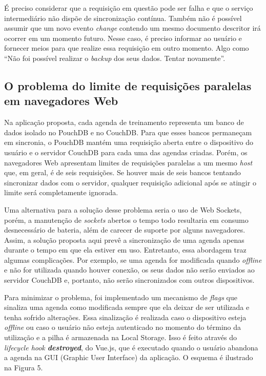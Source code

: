 \documentclass[
	article,			%
	11pt,				%
	oneside,			%
	a4paper,			%
	english,			%
	brazil,				%
	sumario=tradicional
	]{abntex2}
\begin{document}
É preciso considerar que a requisição em questão pode ser falha e que o serviço intermediário não dispõe de sincronização contínua. Também não é possível assumir que um novo evento \textit{change} contendo um mesmo documento descritor irá ocorrer em um momento futuro. Nesse caso, é preciso informar ao usuário e fornecer meios para que realize essa requisição em outro momento. Algo como “Não foi possível realizar o \textit{backup} dos seus dados. Tentar novamente”.

\subsection{O problema do limite de requisições paralelas em navegadores Web}

Na aplicação proposta, cada agenda de treinamento representa um banco de dados isolado no PouchDB e no CouchDB. Para que esses bancos permaneçam em sincronia, o PouchDB mantém uma requisição aberta entre o dispositivo do usuário e o servidor CouchDB para cada uma das agendas criadas. Porém, os navegadores Web apresentam limites de requisições paralelas a um mesmo \textit{host} que, em geral, é de seis requisições. Se houver mais de seis bancos tentando sincronizar dados com o servidor, qualquer requisição adicional após se atingir o limite será completamente ignorada.

Uma alternativa para a solução desse problema seria o uso de Web Sockets, porém, a manutenção de \textit{sockets} abertos o tempo todo resultaria em consumo desnecessário de bateria, além de carecer de suporte por alguns navegadores. Assim, a solução proposta aqui prevê a sincronização de uma agenda apenas durante o tempo em que ela estiver em uso. Entretanto, essa abordagem traz algumas complicações. Por exemplo, se uma agenda for modificada quando \textit{offline} e não for utilizada quando houver conexão, os seus dados não serão enviados ao servidor CouchDB e, portanto, não serão sincronizados com outros dispositivos.

Para minimizar o problema, foi implementado um mecanismo de \textit{flags} que sinaliza uma agenda como modificada sempre que ela deixar de ser utilizada e tenha sofrido alterações. Essa sinalização é realizada caso o dispositivo esteja \textit{offline} ou caso o usuário não esteja autenticado no momento do término da utilização e a pilha é armazenada na Local Storage. Isso é feito através do \textit{lifecycle hook \textbf{destroyed}}, do Vue.js, que é executado quando o usuário abandona a agenda na GUI (Graphic User Interface) da aplicação. O esquema é ilustrado na Figura 5.
\end{document}
